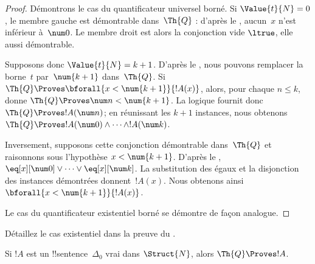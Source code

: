 \documentclass[../../../include/open-logic-section]{subfiles}
\begin{document}
\begin{proof}
Démontrons le cas du quantificateur universel borné.
Si $\Value{t}{N}=0$, le membre gauche est démontrable
dans~$\Th{Q}$ : d'après le
, aucun~$x$
n'est inférieur à~$\num 0$. Le membre droit est alors
la conjonction vide $\ltrue$, elle aussi démontrable.

Supposons donc $\Value{t}{N}=k+1$. D'après le
, nous pouvons remplacer
la borne~$t$ par~$\num{k+1}$ dans~$\Th{Q}$.
Si $\Th{Q}\Proves\bforall{x<\num{k+1}}{!A(x)}$,
alors, pour chaque $n\leq k$,
 donne
$\Th{Q}\Proves\num n<\num{k+1}$.
La logique fournit donc
$\Th{Q}\Proves !A(\num n)$; en réunissant les
$k+1$ instances, nous obtenons
$\Th{Q}\Proves !A(\num 0)\land\dots\land !A(\num k)$.

Inversement, supposons cette conjonction démontrable
dans~$\Th{Q}$ et raisonnons sous l'hypothèse
$x<\num{k+1}$. D'après le
,
$\eq[x][\num 0]\lor\dots\lor\eq[x][\num k]$.
La substitution des égaux et la disjonction des
instances démontrées donnent~$!A(x)$.
Nous obtenons ainsi
$\bforall{x<\num{k+1}}{!A(x)}$.

Le cas du quantificateur existentiel borné se démontre
de façon analogue.
\end{proof}

\begin{prob}
Détaillez le cas existentiel dans la preuve du
.
\end{prob}

\begin{lem}
Si $!A$ est un !!{sentence}~$\Delta_0$ vrai dans
$\Struct{N}$, alors $\Th{Q}\Proves !A$.
\end{lem}
\end{document}
